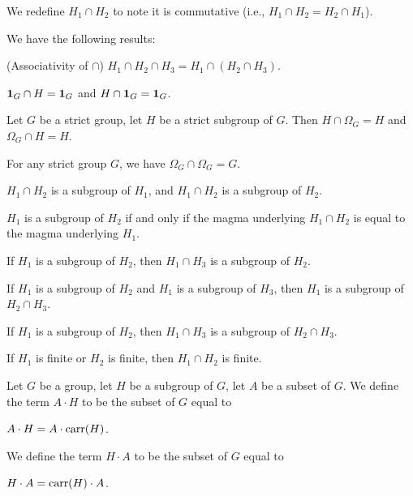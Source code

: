 \documentclass{article}
\begin{document}
\begin{definition}
We redefine $H_{1}\cap H_{2}$ to note it is commutative (i.e., $H_{1}\cap H_{2}=H_{2}\cap H_{1}$).
\end{definition}

We have the following results:
\begin{thm}
\item\label{group2:84} (Associativity of $\cap$)
  $H_{1}\cap H_{2}\cap H_{3}=H_{1}\cap(H_{2}\cap H_{3})$.
\item\label{group2:85} $\mathbf{1}_{G}\cap H=\mathbf{1}_{G}$
  and $H\cap\mathbf{1}_{G}=\mathbf{1}_{G}$.
\item\label{group2:86} Let $G$ be a strict group, let $H$ be a strict
  subgroup of $G$. Then $H\cap\Omega_{G}=H$ and $\Omega_{G}\cap H=H$.
\item\label{group2:87} For any strict group $G$, we have $\Omega_{G}\cap\Omega_{G}=G$.
\item\label{group2:88} $H_{1}\cap H_{2}$ is a subgroup of $H_{1}$, and
  $H_{1}\cap H_{2}$ is a subgroup of $H_{2}$.
\item\label{group2:89} $H_{1}$ is a subgroup of $H_{2}$ if and only if
  the magma underlying $H_{1}\cap H_{2}$ is equal to the magma
  underlying $H_{1}$.
\item\label{group2:90} If $H_{1}$ is a subgroup of $H_{2}$,
  then $H_{1}\cap H_{3}$ is a subgroup of $H_{2}$.
\item\label{group2:91} If $H_{1}$ is a subgroup of $H_{2}$ and $H_{1}$
  is a subgroup of $H_{3}$, then $H_{1}$ is a subgroup of $H_{2}\cap H_{3}$.
\item\label{group2:92} If $H_{1}$ is a subgroup of $H_{2}$,
  then $H_{1}\cap H_{3}$ is a subgroup of $H_{2}\cap H_{3}$.
\item\label{group2:93} If $H_{1}$ is finite or $H_{2}$ is finite, then
  $H_{1}\cap H_{2}$ is finite.
\end{thm}

\begin{definition}
Let $G$ be a group, let $H$ be a subgroup of $G$, let $A$ be a subset of $G$.
We define the term $A\cdot H$ to be the subset of $G$ equal to
\begin{defn}
\item $A\cdot H=A\cdot\operatorname{carr}(H)$.
\end{defn}
We define the term $H\cdot A$ to be the subset of $G$ equal to
\begin{defn}
\item $H\cdot A=\operatorname{carr}(H)\cdot A$.
\end{defn}
\end{definition}
\end{document}
